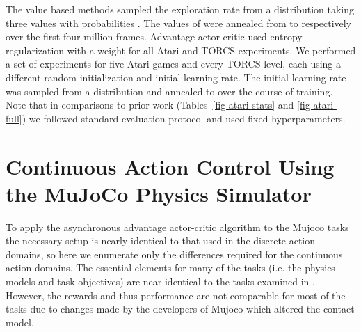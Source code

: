 \documentclass{article} \usepackage{times}
\begin{document}
The value based methods sampled the exploration rate  from a distribution taking three values  with probabilities .
The values of  were annealed from  to  respectively over the first four million frames.
Advantage actor-critic used entropy regularization with a weight  for all Atari and TORCS experiments.
We performed a set of  experiments for five Atari games and every TORCS level, each using a different random initialization and initial learning rate.
The initial learning rate was sampled from a  distribution and annealed to  over the course of training.
Note that in comparisons to prior work (Tables~\ref{fig-atari-stats} and \ref{fig-atari-full}) we followed standard evaluation protocol and used fixed hyperparameters.
 






\section{Continuous Action Control Using the MuJoCo Physics Simulator}
\label{sec:mujoco}







To apply the asynchronous advantage actor-critic algorithm to the Mujoco tasks the
necessary setup is nearly identical to that used in the discrete action domains, so
here we enumerate only the differences required for the continuous action domains.
The essential elements for many of the tasks (i.e. the physics models and task objectives)
are near identical to the tasks examined in \citep{lillicrap2015continuous}.
However, the rewards and thus performance are not comparable for most of the tasks due to
changes made by the developers of Mujoco which altered the contact model.
\end{document}
